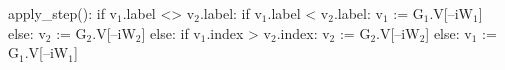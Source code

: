 \begin{blstlisting}
  apply_step():
      if v$_1$.label <> v$_2$.label:
          if v$_1$.label < v$_2$.label: v$_1$ := G$_1$.V[--iW$_1$]
          else:                   v$_2$ := G$_2$.V[--iW$_2$]
      else:
          if v$_1$.index > v$_2$.index: v$_2$ := G$_2$.V[--iW$_2$]
          else:                   v$_1$ := G$_1$.V[--iW$_1$]
\end{blstlisting}
